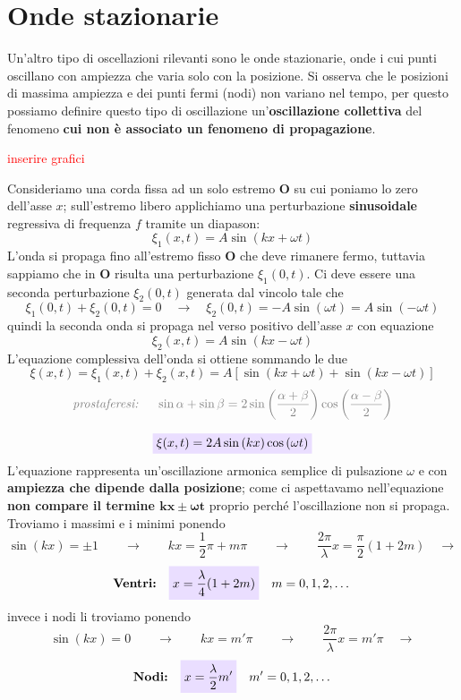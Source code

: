 \documentclass[x11names]{article}
\newcommand{\viola}[1]{\colorbox{myred}{$\displaystyle #1$}}
\begin{document}
		
	\newpage
	\section{Onde stazionarie}
	Un'altro tipo di oscellazioni rilevanti sono le onde stazionarie, onde i cui punti oscillano con ampiezza che varia solo con la posizione. Si osserva che le posizioni di massima ampiezza e dei punti fermi (nodi) non variano nel tempo, per questo possiamo definire questo tipo di oscillazione un'\textbf{oscillazione collettiva} del fenomeno \textbf{cui non è associato un fenomeno di propagazione}. \\
	
	\begin{center}
		\textcolor{red}{inserire grafici}
	\end{center}
	
	\noindent
	Consideriamo una corda fissa ad un solo estremo \(\boldsymbol{O}\) su cui poniamo lo zero dell'asse \(x\); sull'estremo libero applichiamo una perturbazione \textbf{sinusoidale} regressiva di frequenza \(f\) tramite un diapason:
	\[ 
	\xi_1 (x,t) = A\sin\left(kx +\omega t\right) 
	\]
	L'onda si propaga fino all'estremo fisso \(\boldsymbol{O}\) che deve rimanere fermo, tuttavia sappiamo che in \(\boldsymbol{O}\) risulta una perturbazione \(\xi_1(0,t)\). Ci deve essere una seconda perturbazione \(\xi_2(0,t)\) generata dal vincolo tale che
	\[ 
	\xi _1(0,t) + \xi _2 (0,t) = 0 \quad \to \quad \xi _2 (0,t) = - A\sin\left(\omega t\right) = A\sin\left(-\omega t\right)
	\]
	quindi la seconda onda si propaga nel verso positivo dell'asse \(x\) con equazione
	\[ 
	\xi _2 (x,t) = A\sin\left(kx - \omega t\right)
	\]
	L'equazione complessiva dell'onda si ottiene sommando le due
	\[ 
	\xi(x,t) = \xi_1 (x,t) +  \xi _2 (x,t) = A\left[\sin\left(kx +\omega t\right)  + \sin\left(kx - \omega t\right)\right]
	\]
	\[
	\textcolor{gray}{\textit{prostaferesi: } \quad \sin\alpha + \sin\beta = 2\sin\left(\frac{\alpha + \beta}{2}\right)\cos\left(\frac{\alpha - \beta}{2}\right)}
	\]
	
	\begin{equation}
		\viola{\xi (x,t) = 2A\sin\left(kx\right)\cos\left(\omega t\right)}
	\end{equation}
	L'equazione rappresenta  un'oscillazione armonica semplice di pulsazione \(\omega \) e con \textbf{ampiezza che dipende dalla posizione}; come ci aspettavamo nell'equazione \textbf{non compare il termine \(\boldsymbol{kx \pm \omega t}\)} proprio perché l'oscillazione non si propaga. Troviamo i massimi e i minimi ponendo 
	\[ 
	\sin\left(kx\right) = \pm 1 \qquad \to \qquad kx = \frac{1}{2}\pi + m\pi \qquad \to \qquad \frac{2\pi }{\lambda}x = \frac{\pi }{2}(1 + 2m) \quad \to 
	\]
	\begin{equation}
		\textbf{Ventri:} \quad	\viola{x = \frac{\lambda}{4}(1+2m)} \quad m=0,1,2,\dots
	\end{equation}
	invece i nodi li troviamo ponendo 
	\[ 
	\sin\left(kx\right) = 0 \qquad \to \qquad kx =  m'\pi \qquad \to \qquad \frac{2\pi }{\lambda}x = m'\pi  \quad \to 
	\]
	\begin{equation}\label{nodi}
		\textbf{Nodi:} \quad	\viola{x = \frac{\lambda}{2} m'} \quad m'=0,1,2,\dots
	\end{equation}
	
\end{document}
